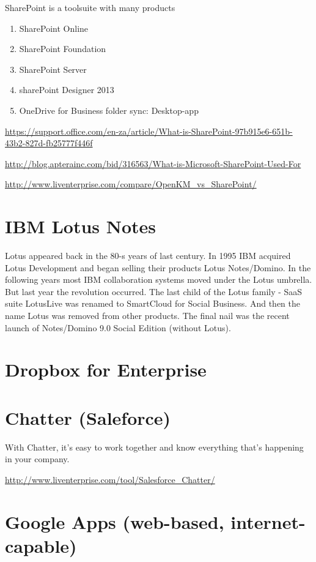 SharePoint is a toolsuite with many products
\begin{enumerate}
  \item SharePoint Online
  \item SharePoint Foundation
  \item SharePoint Server
  \item sharePoint Designer 2013
  \item OneDrive for Business folder sync: Desktop-app
\end{enumerate}
\url{https://support.office.com/en-za/article/What-is-SharePoint-97b915e6-651b-43b2-827d-fb25777f446f}

\url{http://blog.apterainc.com/bid/316563/What-is-Microsoft-SharePoint-Used-For}

\url{http://www.liventerprise.com/compare/OpenKM_vs_SharePoint/}

\section{IBM Lotus Notes}

Lotus appeared back in the 80-s years of last century. In 1995 IBM acquired
Lotus Development and began selling their products Lotus Notes/Domino. In the
following years most IBM collaboration systems moved under the Lotus umbrella.
But last year the revolution occurred. The last child of the Lotus family - SaaS
suite LotusLive was renamed to SmartCloud for Social Business. And then the name
Lotus was removed from other products. The final nail was the recent launch of
Notes/Domino 9.0 Social Edition (without Lotus).


\section{Dropbox for Enterprise}


\section{Chatter (Saleforce)}
\label{sec:Chatter}

With Chatter, it's easy to work together and know everything that's happening in your company.

\url{http://www.liventerprise.com/tool/Salesforce_Chatter/}


\section{Google Apps (web-based, internet-capable)}

